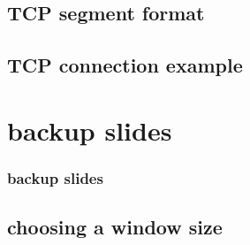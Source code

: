 \subsection{TCP segment format}




%

\subsection{TCP connection example}






\section{backup slides}
\begin{frame}\frametitle{backup slides}
\end{frame}
\subsection{choosing a window size}








